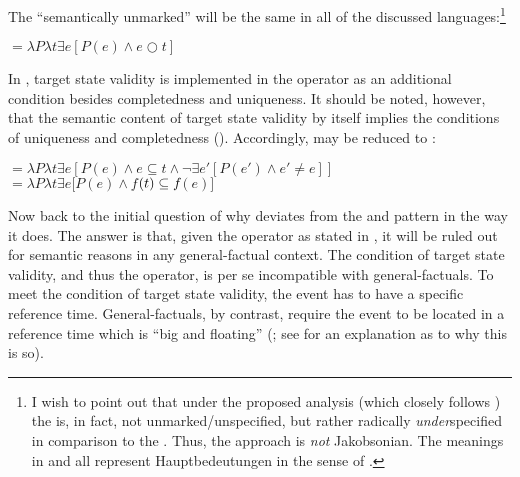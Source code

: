 \documentclass[output=paper,modfonts,newtxmath,hidelinks]{langscibook}
\begin{document}
\noindent The ``semantically unmarked''  will be the same in all of the discussed languages:\footnote{\label{13:fnm}I wish to point out that under the proposed analysis (which closely follows \citealt{Gronn2004}) the  is, in fact, not unmarked/unspecified, but rather radically \textit{under}specified in comparison to the . Thus, the approach is \textit{not} Jakobsonian. The meanings in  and  all represent Hauptbedeutungen in the sense of \citet[178]{Kury60}.}

\begin{exe}
\ex\label{13:czru3}
${}= \lambda P \lambda t \exists e [ P(e) \wedge e \bigcirc t  ]$
\end{exe}

\noindent In , target state validity is implemented in the   operator as an additional condition besides completedness and uniqueness.
It should be noted, however, that the semantic content of target state validity by itself implies the conditions of uniqueness and completedness (\citealt[342--344]{Mittw08}).
Accordingly,  may be reduced to :  

\begin{exe}
\ex\label{13:czru4}
${}= \lambda P \lambda t \exists e [ P(e) \wedge e \subseteq t \wedge \neg \exists e'[ P(e') \wedge e' \neq e ]]$\smallskip\\
${}= \lambda P \lambda t \exists e [ P(e) \wedge f$\hspace{-2pt}$(t)  \subseteq f\hspace{-2pt}$$(e)]$
\end{exe}

\noindent Now back to the initial question of why  deviates from the  and  pattern in the way it does. The answer is that, given the   
operator as stated in , it will be ruled out for semantic reasons in any general-factual context.
The condition of target state validity, and thus the  operator, is per se incompatible with general-factuals. 
To meet the condition of target state validity,
the event has to have a specific reference time. General-factuals, by contrast, require the event to be located in 
a reference time which is ``big and floating'' 
(\citealt[273]{Gronn2004}; see \citealt{omr16} for an explanation as to why this is so).  
\end{document}
